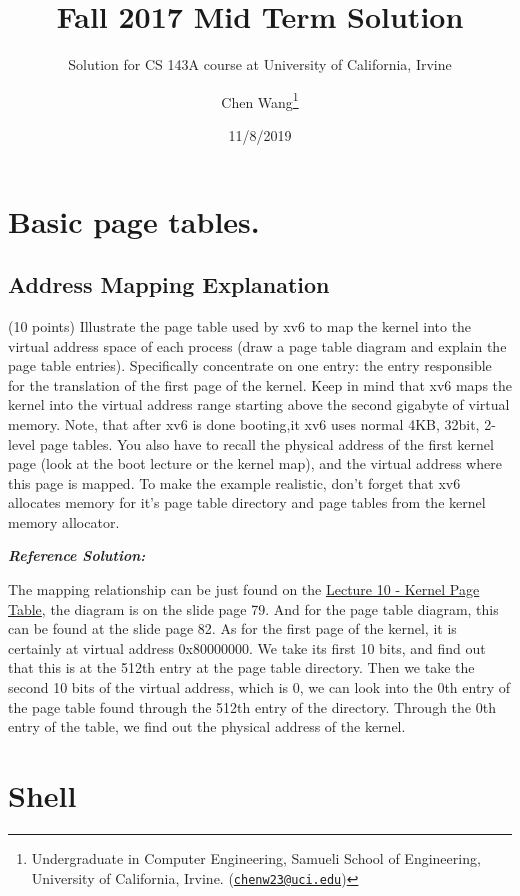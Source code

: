 \documentclass[]{article}
\title{Fall 2017 Mid Term Solution}
\subtitle{Solution for CS 143A course at University of California, Irvine}
\author{Chen Wang\footnote{Undergraduate in Computer Engineering, Samueli School
  of Engineering, University of California, Irvine.
  (\href{mailto:chenw23@uci.edu}{\nolinkurl{chenw23@uci.edu}})}}
\date{11/8/2019}
\begin{document}
\maketitle

{
\setcounter{tocdepth}{3}
\tableofcontents
}
\hypertarget{basic-page-tables.}{%
\section{Basic page tables.}\label{basic-page-tables.}}

\hypertarget{address-mapping-explanation}{%
\subsection{Address Mapping
Explanation}\label{address-mapping-explanation}}

(10 points) Illustrate the page table used by xv6 to map the kernel into
the virtual address space of each process (draw a page table diagram and
explain the page table entries). Specifically concentrate on one entry:
the entry responsible for the translation of the first page of the
kernel. Keep in mind that xv6 maps the kernel into the virtual address
range starting above the second gigabyte of virtual memory. Note, that
after xv6 is done booting,it xv6 uses normal 4KB, 32bit, 2-level page
tables. You also have to recall the physical address of the first kernel
page (look at the boot lecture or the kernel map), and the virtual
address where this page is mapped. To make the example realistic, don't
forget that xv6 allocates memory for it's page table directory and page
tables from the kernel memory allocator.

\textbf{\emph{Reference Solution:}}

The mapping relationship can be just found on the
\href{https://www.ics.uci.edu/~aburtsev/143A/lectures/lecture10-kernel-page-table/lecture10-kernel-page-table.pdf}{Lecture
10 - Kernel Page Table}, the diagram is on the slide page 79. And for
the page table diagram, this can be found at the slide page 82. As for
the first page of the kernel, it is certainly at virtual address
0x80000000. We take its first 10 bits, and find out that this is at the
512th entry at the page table directory. Then we take the second 10 bits
of the virtual address, which is 0, we can look into the 0th entry of
the page table found through the 512th entry of the directory. Through
the 0th entry of the table, we find out the physical address of the
kernel.

\hypertarget{shell}{%
\section{Shell}\label{shell}}
\end{document}
